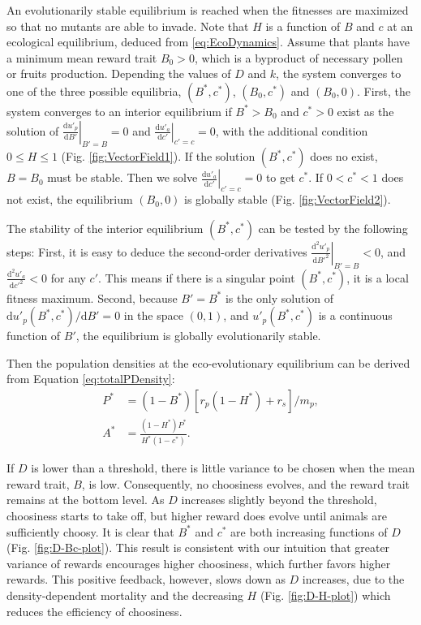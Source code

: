 \documentclass[12pt]{article}
\begin{document}
An evolutionarily stable equilibrium is reached when the fitnesses are maximized so that no mutants are able to invade. Note that $H$ is a function of $B$ and $c$ at an ecological equilibrium, deduced from \eqref{eq:EcoDynamics}. Assume that plants have a minimum mean reward trait $B_0>0$, which is a byproduct of necessary pollen or fruits production. Depending the values of $D$ and $k$, the system converges to one of the three possible equilibria, $(B^*, c^*)$, $(B_0, c^*)$ and $(B_0, 0)$. First, the system converges to an interior equilibrium if $B^*>B_0$ and $c^*>0$ exist as the solution of $\left.\frac{\mathrm{d} u'_p}{\mathrm{d} B'} \right|_{B' = B}=0$ and $\left.\frac{\mathrm{d} u'_a}{\mathrm{d} c'}\right|_{c'=c}=0$, with the additional condition $0 \leq H \leq 1$ (Fig. \ref{fig:VectorField1}). If the solution $(B^*, c^*)$ does no exist, $B = B_0$ must be stable. Then we solve $\left.\frac{\mathrm{d} u'_a}{\mathrm{d} c'}\right|_{c'=c}=0$ to get $c^*$. If $0<c^*<1$ does not exist, the equilibrium $(B_0, 0)$ is globally stable (Fig. \ref{fig:VectorField2}).

The stability of the interior equilibrium $(B^*, c^*)$ can be tested by the following steps: First, it is easy to deduce the second-order derivatives $\left.\frac{\mathrm{d}^2 u'_p}{\mathrm{d} {B'}^2}\right|_{B'=B} <0$, and $\frac{\mathrm{d}^2 u'_a}{\mathrm{d} {c'}^2} <0$ for any $c'$. This means if there is a singular point $(B^*, c^*)$, it is a local fitness maximum. Second, because $B'=B^*$ is the only solution of $\mathrm{d} u'_p(B^*, c^*) / \mathrm{d} {B'} = 0$ in the space $(0,1)$, and $u'_p(B^*, c^*)$ is a continuous function of $B'$, the equilibrium is globally evolutionarily stable. 

Then the population densities at the eco-evolutionary equilibrium can be derived from Equation \eqref{eq:totalPDensity}:
\begin{subequations}
\begin{align}
P^* &=(1-B^*) \left[r_p (1-H^*) + r_s \right]/m_p ,\\
A^* &=\frac{(1-H^*) P^*}{H^* (1-c^*)}.
\end{align}
\end{subequations}

If $D$ is lower than a threshold, there is little variance to be chosen when the mean reward trait, $B$, is low. Consequently, no choosiness evolves, and the reward trait remains at the bottom level. As $D$ increases slightly beyond the threshold, choosiness starts to take off, but higher reward does evolve until animals are sufficiently choosy. It is clear that $B^*$ and $c^*$ are both increasing functions of $D$ (Fig. \ref{fig:D-Bc-plot}). This result is consistent with our intuition that greater variance of rewards encourages higher choosiness, which further favors higher rewards. This positive feedback, however, slows down as $D$ increases, due to the density-dependent mortality and the decreasing $H$ (Fig. \ref{fig:D-H-plot}) which reduces the efficiency of choosiness.
\end{document}
